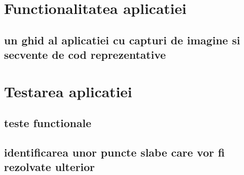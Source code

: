 \section{Functionalitatea aplicatiei}
    \subsection{un ghid al aplicatiei cu capturi de imagine si secvente de cod reprezentative}
\section{Testarea aplicatiei}
    \subsection{teste functionale}
    \subsection{identificarea unor puncte slabe care vor fi rezolvate ulterior}